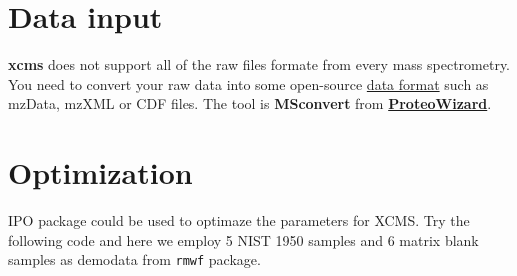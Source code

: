 \documentclass[
]{book}
\begin{document}
\hypertarget{data-input}{%
\section{Data input}\label{data-input}}

\textbf{xcms} does not support all of the raw files formate from every mass spectrometry. You need to convert your raw data into some open-source \href{https://en.wikipedia.org/wiki/Mass_spectrometry_data_format}{data format} such as mzData, mzXML or CDF files. The tool is \textbf{MSconvert} from \href{http://proteowizard.sourceforge.net/}{\textbf{ProteoWizard}}.

\hypertarget{optimization}{%
\section{Optimization}\label{optimization}}

IPO package could be used to optimaze the parameters for XCMS. Try the following code and here we employ 5 NIST 1950 samples and 6 matrix blank samples as demodata from \texttt{rmwf} package.
\end{document}
